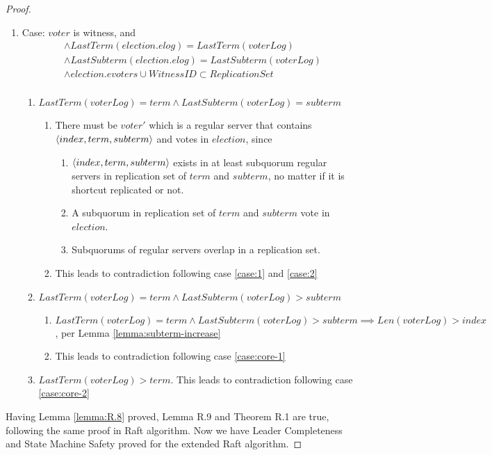 \begin{proof}
\begin{enumerate}
		\item Case: \label{case:4} $voter$ is witness, and
		\begin{displaymath} 
			\begin{aligned}
				&\land LastTerm(election.elog) = LastTerm(voterLog) \\
				&\land LastSubterm(election.elog) = LastSubterm(voterLog) \\
				&\land election.evoters \cup {WitnessID} \subset ReplicationSet \\
			\end{aligned}	
		\end{displaymath}
		\begin{enumerate}
			\item $LastTerm(voterLog)=term \land LastSubterm(voterLog)=subterm$
			\begin{enumerate}
				\item There must be $voter'$ which is a regular server that contains $\langle index,term,subterm \rangle$ and votes in $election$, since
				\begin{enumerate}
					\item $\langle index,term,subterm \rangle$ exists in at least subquorum regular servers in replication set of $term$ and $subterm$, no matter if it is shortcut replicated or not.
					\item A subquorum in replication set of $term$ and $subterm$ vote in $election$.
					\item Subquorums of regular servers overlap in a replication set.
				\end{enumerate}
				\item This leads to contradiction following case \ref{case:1} and \ref{case:2}
			\end{enumerate}
			\item $LastTerm(voterLog)=term \land LastSubterm(voterLog)>subterm$
			\begin{enumerate}
				\item $LastTerm(voterLog)=term \land LastSubterm(voterLog)>subterm \implies Len(voterLog)>index$, per Lemma \ref{lemma:subterm-increase}
				\item This leads to contradiction following case \ref{case:core-1}
			\end{enumerate}
			\item $LastTerm(voterLog) > term$. This leads to contradiction following case \ref{case:core-2}
		\end{enumerate}
	\end{enumerate}

	Having Lemma \ref{lemma:R.8} proved, Lemma R.9 and Theorem R.1 are true, following the same proof in Raft algorithm. Now we have Leader Completeness and State Machine Safety proved for the extended Raft algorithm.
\end{proof}